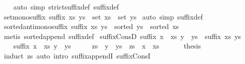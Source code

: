\begin{isabellebody}
%
\isadelimproof
\ \ %
\endisadelimproof
%
\isatagproof
{}\isamarkupfalse%
\ {\isacharparenleft}auto\ simp{\isacharcolon}\ strict{\isacharunderscore}suffix{\isacharunderscore}def\ suffix{\isacharunderscore}def{\isacharparenright}%
\endisatagproof
{\isafoldproof}%
%
\isadelimproof
\isanewline
%
\endisadelimproof
\isanewline
{}\isamarkupfalse%
\ set{\isacharunderscore}mono{\isacharunderscore}suffix{\isacharcolon}\ {\isachardoublequoteopen}suffix\ xs\ ys\ {\isasymLongrightarrow}\ set\ xs\ {\isasymsubseteq}\ set\ ys{\isachardoublequoteclose}\isanewline
%
\isadelimproof
%
\endisadelimproof
%
\isatagproof
{}\isamarkupfalse%
\ {\isacharparenleft}auto\ simp{\isacharcolon}\ suffix{\isacharunderscore}def{\isacharparenright}%
\endisatagproof
{\isafoldproof}%
%
\isadelimproof
\isanewline
%
\endisadelimproof
\isanewline
{}\isamarkupfalse%
\ sorted{\isacharunderscore}antimono{\isacharunderscore}suffix{\isacharcolon}\ {\isachardoublequoteopen}suffix\ xs\ ys\ {\isasymLongrightarrow}\ sorted\ ys\ {\isasymLongrightarrow}\ sorted\ xs{\isachardoublequoteclose}\isanewline
%
\isadelimproof
%
\endisadelimproof
%
\isatagproof
{}\isamarkupfalse%
\ {\isacharparenleft}metis\ sorted{\isacharunderscore}append\ suffix{\isacharunderscore}def{\isacharparenright}%
\endisatagproof
{\isafoldproof}%
%
\isadelimproof
\isanewline
%
\endisadelimproof
\isanewline
{}\isamarkupfalse%
\ suffix{\isacharunderscore}ConsD{}{\isacharcolon}\ {\isachardoublequoteopen}suffix\ {\isacharparenleft}x\ {\isacharhash}\ xs{\isacharparenright}\ {\isacharparenleft}y\ {\isacharhash}\ ys{\isacharparenright}\ {\isasymLongrightarrow}\ suffix\ xs\ ys{\isachardoublequoteclose}\isanewline
%
\isadelimproof
%
\endisadelimproof
%
\isatagproof
{}\isamarkupfalse%
\ {\isacharminus}\isanewline
\ \ \isamarkupfalse%
\ {\isachardoublequoteopen}suffix\ {\isacharparenleft}x\ {\isacharhash}\ xs{\isacharparenright}\ {\isacharparenleft}y\ {\isacharhash}\ ys{\isacharparenright}{\isachardoublequoteclose}\isanewline
\ \ \isamarkupfalse%
\ \isamarkupfalse%
\ zs\ \ {\isachardoublequoteopen}y\ {\isacharhash}\ ys\ {\isacharequal}\ zs\ {\isacharat}\ x\ {\isacharhash}\ xs{\isachardoublequoteclose}\ \isacommand{{\isachardot}{\isachardot}}\isamarkupfalse%
\isanewline
\ \ \isamarkupfalse%
\ \isamarkupfalse%
\ {\isacharquery}thesis\isanewline
\ \ \ \ \isamarkupfalse%
\ {\isacharparenleft}induct\ zs{\isacharparenright}\ {\isacharparenleft}auto\ intro{\isacharbang}{\isacharcolon}\ suffix{\isacharunderscore}appendI\ suffix{\isacharunderscore}ConsI{\isacharparenright}\isanewline

\end{isabellebody}
